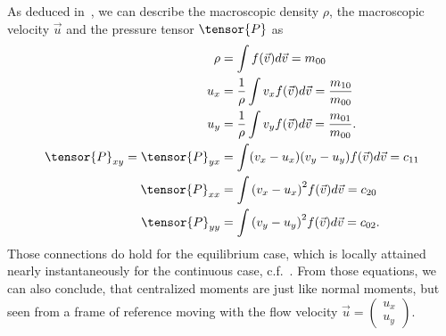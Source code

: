 As deduced in~\cite[pages 23 ff.]{harris2004introduction}, we can describe the macroscopic density $\rho$, the macroscopic velocity $\vec{u}$ and the pressure tensor $\tensor{P}$ as
\begin{equation}
  \label{eq: physical quantities}
  \begin{aligned}
    \rho & = \int f(\vec{v}) d\vec{v} = m_{00} \\
    u_x
    & = \frac{1}{\rho}\int v_x f(\vec{v}) d\vec{v} = \frac{ m_{10} }{ m_{00} }\\
    u_y
    & = \frac{1}{\rho}\int v_y f(\vec{v}) d\vec{v} = \frac{ m_{01} }{ m_{00} }.\\
    \tensor{P}_{xy}=\tensor{P}_{yx}
    & = \int (v_x - u_x)(v_y - u_y) f(\vec{v}) d\vec{v}
      = c_{11} \\
    \tensor{P}_{xx}
    & = \int {(v_x - u_x)}^2 f(\vec{v}) d\vec{v}
      = c_{20} \\
    \tensor{P}_{yy}
    & = \int {(v_y - u_y)}^2 f(\vec{v}) d\vec{v}
      = c_{02} .
  \end{aligned}
\end{equation}
Those connections do hold for the equilibrium case, which is locally attained nearly instantaneously for the continuous case, c.f.~\cite[page 218]{smits2000physical}.
From those equations, we can also conclude, that centralized moments are just like normal moments, but seen from a frame of reference moving with the flow velocity $\vec{u}=\begin{pmatrix}u_x\\u_y\end{pmatrix}$.

